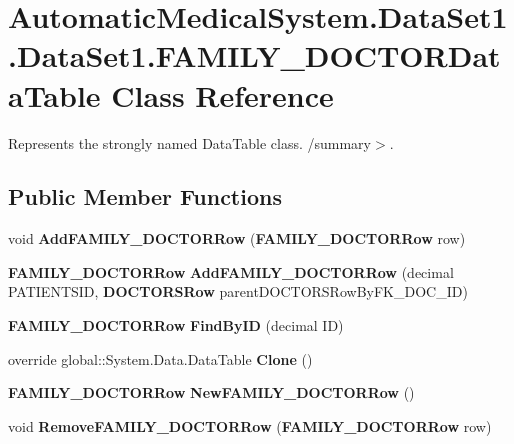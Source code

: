 \section{AutomaticMedicalSystem.DataSet1.DataSet1.FAMILY\_\-DOCTORDataTable Class Reference}
\label{class_automatic_medical_system_1_1_data_set1_1_1_f_a_m_i_l_y___d_o_c_t_o_r_data_table}
Represents the strongly named DataTable class. /summary$>$.  


\subsection*{Public Member Functions}
\begin{CompactItemize}
\item 
void \textbf{AddFAMILY\_\-DOCTORRow} ({\bf FAMILY\_\-DOCTORRow} row)\label{class_automatic_medical_system_1_1_data_set1_1_1_f_a_m_i_l_y___d_o_c_t_o_r_data_table_400c036f2af146a99e12e7acc917fe8a}

\item 
{\bf FAMILY\_\-DOCTORRow} \textbf{AddFAMILY\_\-DOCTORRow} (decimal PATIENTSID, {\bf DOCTORSRow} parentDOCTORSRowByFK\_\-DOC\_\-ID)\label{class_automatic_medical_system_1_1_data_set1_1_1_f_a_m_i_l_y___d_o_c_t_o_r_data_table_9baec86ea337b6556a90cf9869c4b71a}

\item 
{\bf FAMILY\_\-DOCTORRow} \textbf{FindByID} (decimal ID)\label{class_automatic_medical_system_1_1_data_set1_1_1_f_a_m_i_l_y___d_o_c_t_o_r_data_table_c6be1d4522f2179ccaccc3f73070b827}

\item 
override global::System.Data.DataTable \textbf{Clone} ()\label{class_automatic_medical_system_1_1_data_set1_1_1_f_a_m_i_l_y___d_o_c_t_o_r_data_table_723219b51c223aeaceaf219a36e198ef}

\item 
{\bf FAMILY\_\-DOCTORRow} \textbf{NewFAMILY\_\-DOCTORRow} ()\label{class_automatic_medical_system_1_1_data_set1_1_1_f_a_m_i_l_y___d_o_c_t_o_r_data_table_ae0d054fcd79bab3466375661af599f3}

\item 
void \textbf{RemoveFAMILY\_\-DOCTORRow} ({\bf FAMILY\_\-DOCTORRow} row)\label{class_automatic_medical_system_1_1_data_set1_1_1_f_a_m_i_l_y___d_o_c_t_o_r_data_table_75468a0e7dd96797d7914dcb3b7f75bf}

\end{CompactItemize}

